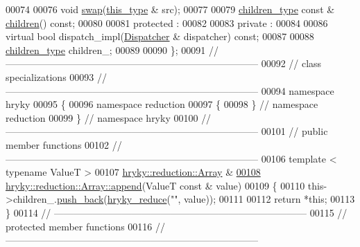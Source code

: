 \begin{DoxyCode}
00074 
00076     \textcolor{keywordtype}{void} \hyperlink{classhryky_1_1reduction_1_1_array_a05d6ce4a51b1d89f975e0329076a7533}{swap}(\hyperlink{classhryky_1_1reduction_1_1_array}{this_type} & src);
00077 
00079     \hyperlink{classhryky_1_1_vector}{children_type} \textcolor{keyword}{const} & \hyperlink{classhryky_1_1reduction_1_1_array_aacaeae04bbd9911594394d06773b2799}{children}() \textcolor{keyword}{const};
00080 
00081 \textcolor{keyword}{protected} :
00082 
00083 \textcolor{keyword}{private} :
00084 
00086     \textcolor{keyword}{virtual} \textcolor{keywordtype}{bool} dispatch\_impl(\hyperlink{classhryky_1_1reduction_1_1_dispatcher}{Dispatcher} & dispatcher) \textcolor{keyword}{const};
00087 
00088     \hyperlink{classhryky_1_1_vector}{children_type} children\_;
00089 
00090 \};
00091 \textcolor{comment}{//
      ------------------------------------------------------------------------------}
00092 \textcolor{comment}{// class specializations}
00093 \textcolor{comment}{//
      ------------------------------------------------------------------------------}
00094 \textcolor{keyword}{namespace }hryky
00095 \{
00096 \textcolor{keyword}{namespace }reduction
00097 \{
00098 \} \textcolor{comment}{// namespace reduction}
00099 \} \textcolor{comment}{// namespace hryky}
00100 \textcolor{comment}{//
      ------------------------------------------------------------------------------}
00101 \textcolor{comment}{// public member functions}
00102 \textcolor{comment}{//
      ------------------------------------------------------------------------------}
00106 \textcolor{comment}{}\textcolor{keyword}{template} < \textcolor{keyword}{typename} ValueT >
00107 \hyperlink{classhryky_1_1reduction_1_1_array}{hryky::reduction::Array} &
\hypertarget{reduction__array_8h_source_l00108}{}\hyperlink{classhryky_1_1reduction_1_1_array_ab4f43bd47a0ef7060e7b2818243199bd}{00108} \hyperlink{classhryky_1_1reduction_1_1_array_aec3f3c562f47d02096be058fb04599c8}{hryky::reduction::Array::append}(ValueT \textcolor{keyword}{const} & value)
00109 \{
00110     this->children\_.\hyperlink{classhryky_1_1_vector_ad977480678e6051db6d10a6abc3a54b7}{push_back}(\hyperlink{reduction__common_8h_afc72326c9900838c5db40438318794dd}{hryky_reduce}(\textcolor{stringliteral}{""}, value));
00111 
00112     \textcolor{keywordflow}{return} *\textcolor{keyword}{this};
00113 \}
00114 \textcolor{comment}{//
      ------------------------------------------------------------------------------}
00115 \textcolor{comment}{// protected member functions}
00116 \textcolor{comment}{//
      ------------------------------------------------------------------------------}

\end{DoxyCode}
